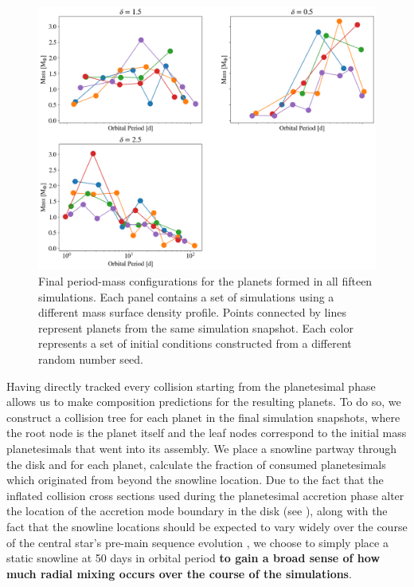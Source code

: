 \begin{figure}
\begin{center}
    \includegraphics[width=\textwidth]{figures/stip/per_mass_full.png}
    \caption{Final period-mass configurations for the planets formed in all fifteen simulations. Each panel contains a set of simulations using a different mass surface density profile. Points connected by lines represent planets from the same simulation snapshot. Each color represents a set of initial conditions constructed from a different random number seed.\label{fig:per_mass_full}}
\end{center}
\end{figure}

Having directly tracked every collision starting from the planetesimal phase allows us to make composition predictions for the resulting planets. To do so, we construct a collision tree for each planet in the final simulation snapshots, where the root node is the planet itself and the leaf nodes correspond to the initial mass planetesimals that went into its assembly. We place a snowline partway through the disk and for each planet, calculate the fraction of consumed planetesimals which originated from beyond the snowline location. Due to the fact that the inflated collision cross sections used during the planetesimal accretion phase alter the location of the accretion mode boundary in the disk (see \cite{wallace23}), along with the fact that the snowline locations should be expected to vary widely over the course of the central star's pre-main sequence evolution \cite{baraffe15}, we choose to simply place a static snowline at 50 days in orbital period \textbf{to gain a broad sense of how much radial mixing occurs over the course of the simulations}.

